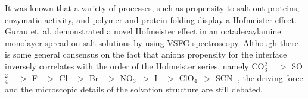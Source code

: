 
%

It was known that a variety of processes, such as propensity to salt-out proteins, enzymatic activity, and polymer and protein folding display a Hofmeister effect.
Gurau et. al.\cite{Gurau2004} demonstrated a novel Hofmeister effect in an octadecaylamine monolayer spread on salt solutions by using VSFG spectroscopy.
Although there is some general consensus on the fact that anions propensity for the interface inversely correlates with
the order of the Hofmeister series, namely 
CO$_3^{2-}$ $>$  SO$_4^{2-}$ $>$ F$^-$ $>$ Cl$^-$ $>$ Br$^-$ $>$ NO$_3^-$ $>$ I$^-$ $>$ ClO$_4^-$ $>$ SCN$^-$\cite{PJ06,ZYJ10,DT08,Parsons2011,HuaWei2013}, 
the driving force and the microscopic details of the solvation structure are still debated. 


